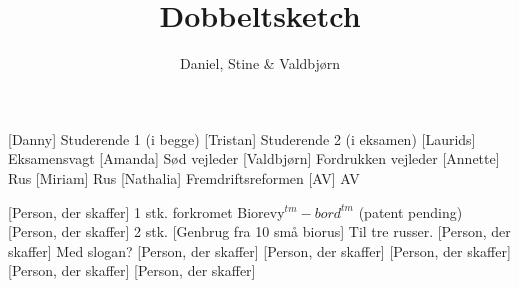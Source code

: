 \documentclass[a4paper,11pt]{article}
\title{Dobbeltsketch}
\author{Daniel, Stine \& Valdbjørn}
\begin{document}
\maketitle

\begin{roles}
    [Danny] Studerende 1 (i begge)
    [Tristan] Studerende 2 (i eksamen)
    [Laurids] Eksamensvagt
    [Amanda] Sød vejleder
    [Valdbjørn] Fordrukken vejleder
    [Annette] Rus 
    [Miriam] Rus 
    [Nathalia] Fremdriftsreformen 
    [AV] AV
\end{roles}

\begin{props}
    [Person, der skaffer] 1 stk. forkromet Biorevy$^{tm}-bord^{tm}$ (patent pending)
    [Person, der skaffer] 2 stk.
    [Genbrug fra 10 små biorus] Til tre russer.
    [Person, der skaffer] Med slogan?
    [Person, der skaffer]
    [Person, der skaffer]
    [Person, der skaffer]
    [Person, der skaffer]
    [Person, der skaffer]
\end{props}
\end{document}
